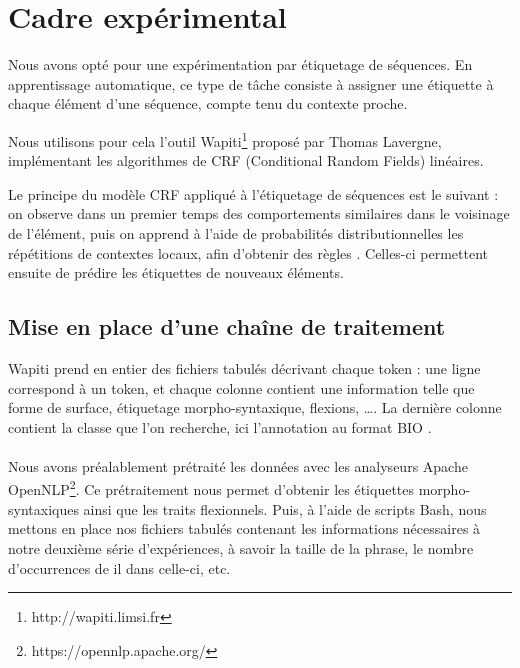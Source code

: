 \documentclass[a4paper,12pt]{article}
\begin{document}
\section{Cadre expérimental}

Nous avons opté pour une expérimentation par étiquetage de séquences. En apprentissage automatique, ce type de tâche consiste à assigner une étiquette à chaque élément d'une séquence, compte tenu du contexte proche.

Nous utilisons pour cela l'outil Wapiti\footnote{http://wapiti.limsi.fr} proposé par Thomas Lavergne, implémentant les algorithmes de CRF (Conditional Random Fields) linéaires.

Le principe du modèle CRF appliqué à l'étiquetage de séquences est le suivant : on observe dans un premier temps des comportements similaires dans le voisinage de l'élément, puis on apprend à l'aide de probabilités distributionnelles les répétitions de contextes locaux, afin d'obtenir des \og règles \fg{}. Celles-ci permettent ensuite de prédire les étiquettes de nouveaux éléments.


\subsection{Mise en place d'une chaîne de traitement}

Wapiti prend en entier des fichiers tabulés décrivant chaque token : une ligne correspond à un token, et chaque colonne contient une information telle que forme de surface, étiquetage morpho-syntaxique, flexions, \ldots. La dernière colonne contient la classe que l'on recherche, ici l'annotation au format BIO .

\paragraph{}
Nous avons préalablement prétraité les données avec les analyseurs Apache OpenNLP\footnote{https://opennlp.apache.org/}\cite{boudin:detection:taln12}. 
Ce prétraitement nous permet d'obtenir les étiquettes morpho-syntaxiques ainsi que les traits flexionnels.
Puis, à l'aide de scripts Bash, nous mettons en place nos fichiers tabulés contenant les informations nécessaires à notre deuxième série d'expériences, à savoir la taille de la phrase, le nombre d'occurrences de \og il \fg{} dans celle-ci, etc.
\end{document}
